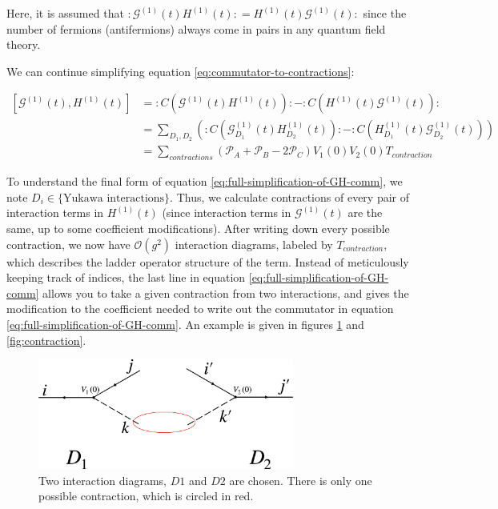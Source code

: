 Here, it is assumed that $:\mathcal{G}^{(1)}(t)H^{(1)}(t): = H^{(1)}(t)\mathcal{G}^{(1)}(t): $ since the number of fermions (antifermions) always come in pairs in any quantum field theory.

We can continue simplifying equation \ref{eq:commutator-to-contractions}:

\begin{align}
    \label{eq:full-simplification-of-GH-comm}
    \left[\mathcal{G}^{(1)}(t), H^{(1)}(t) \right] &= :C\left(\mathcal{G}^{(1)}(t)H^{(1)}(t)\right): - :C\left(H^{(1)}(t) \mathcal{G}^{(1)}(t)\right):\\ \nonumber
    &= \sum_{D_1, D_2} \left(:C\left(\mathcal{G}_{D_1}^{(1)}(t)H_{D_2}^{(1)}(t)\right): - :C\left(H^{(1)}_{D_1}(t) \mathcal{G}^{(1)}_{D_2}(t)\right) \right) \\ \nonumber
    &= \sum_{contractions} \left(\mathcal{P}_A + \mathcal{P}_B -2\mathcal{P}_C  \right)V_1(0) V_2(0)T_{contraction}
\end{align}

To understand the final form of equation \ref{eq:full-simplification-of-GH-comm}, we note $D_i \in \{\text{Yukawa interactions} \}$. 
Thus, we calculate contractions of every pair of interaction terms in $H^{(1)}(t)$ (since interaction terms in $\mathcal{G}^{(1)}(t)$ are the same, up to some coefficient modifications).
After writing down every possible contraction, we now have $\mathcal{O}(g^2)$ interaction diagrams, labeled by $T_{contraction}$, which describes the ladder operator structure of the term. 
Instead of meticulously keeping track of indices, the last line in equation \ref{eq:full-simplification-of-GH-comm} allows you to take a given contraction from two interactions, and gives the modification to the coefficient needed to write out the commutator in equation \ref{eq:full-simplification-of-GH-comm}.
An example is given in figures \ref{fig:D1D2} and \ref{fig:contraction}.

\begin{figure}
    \includegraphics[width = 0.75\textwidth]{figures/D1D2.pdf}
    \caption{Two interaction diagrams, $D1$ and $D2$ are chosen. There is only one possible contraction, which is circled in red.}
    \label{fig:D1D2}
\end{figure}

